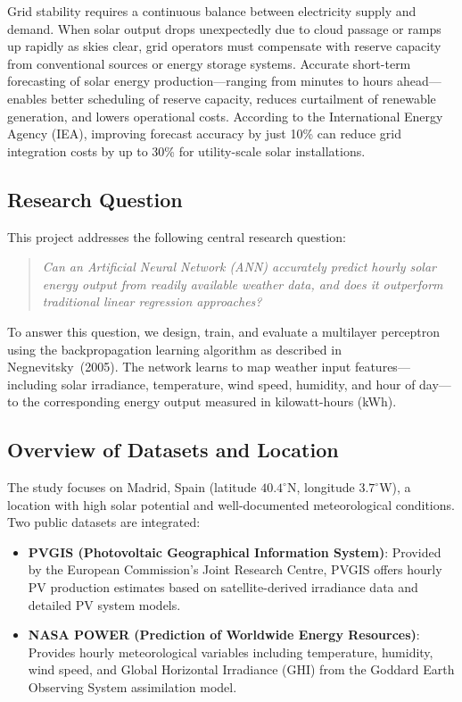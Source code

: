 \documentclass[11pt, a4paper]{article}
\begin{document}
Grid stability requires a continuous balance between electricity supply and demand.
When solar output drops unexpectedly due to cloud passage or ramps up rapidly as
skies clear, grid operators must compensate with reserve capacity from conventional
sources or energy storage systems. Accurate short-term forecasting of solar energy
production---ranging from minutes to hours ahead---enables better scheduling of
reserve capacity, reduces curtailment of renewable generation, and lowers operational
costs. According to the International Energy Agency (IEA), improving forecast
accuracy by just 10\% can reduce grid integration costs by up to 30\% for
utility-scale solar installations.

\subsection{Research Question}

This project addresses the following central research question:

\begin{quote}
\textit{Can an Artificial Neural Network (ANN) accurately predict hourly solar energy
output from readily available weather data, and does it outperform traditional
linear regression approaches?}
\end{quote}

To answer this question, we design, train, and evaluate a multilayer perceptron
using the backpropagation learning algorithm as described in Negnevitsky~(2005).
The network learns to map weather input features---including solar irradiance,
temperature, wind speed, humidity, and hour of day---to the corresponding energy
output measured in kilowatt-hours (kWh).

\subsection{Overview of Datasets and Location}

The study focuses on Madrid, Spain (latitude $40.4^\circ$N, longitude $3.7^\circ$W),
a location with high solar potential and well-documented meteorological conditions.
Two public datasets are integrated:

\begin{itemize}
    \item \textbf{PVGIS (Photovoltaic Geographical Information System)}: Provided by
the European Commission's Joint Research Centre, PVGIS offers hourly PV production
estimates based on satellite-derived irradiance data and detailed PV system models.
    \item \textbf{NASA POWER (Prediction of Worldwide Energy Resources)}: Provides
hourly meteorological variables including temperature, humidity, wind speed, and
Global Horizontal Irradiance (GHI) from the Goddard Earth Observing System
assimilation model.
\end{itemize}
\end{document}
